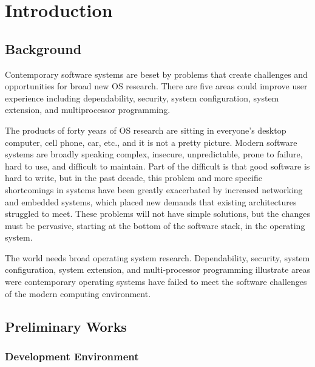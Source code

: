 \documentclass{swfcthesis}
\begin{document}

\makepreliminarypages%
\frontmatter          
\tableofcontents     %
\listoffigures       %
\listoftables        %
\listoffixmes

\mainmatter

\chapter{Introduction}

\section{Background}
\label{sec:background}


Contemporary software systems are beset by problems that create challenges and
opportunities for broad new OS research. There are five areas could improve user
experience including dependability, security, system configuration, system extension, and
multiprocessor programming.

The products of forty years of OS research are sitting in everyone's desktop
computer, cell phone, car, etc., and it is not a pretty picture.
Modern software systems are broadly speaking complex, insecure, unpredictable, prone to
failure, hard to use, and difficult to maintain. Part of the difficult is that good
software is hard to write, but in the past decade, this problem and more specific
shortcomings in systems have been greatly exacerbated by increased networking and embedded
systems, which placed new demands that existing architectures struggled to meet. These
problems will not have simple solutions, but the changes must be pervasive, starting at
the bottom of the software stack, in the operating system.

The world needs broad operating system research. Dependability, security, system
configuration, system extension, and multi-processor programming
illustrate areas were contemporary operating systems have failed to meet the software
challenges of the modern computing environment.

\section{Preliminary Works}

\subsection{Development Environment}
\label{sec:devel-envir}
\end{document}
